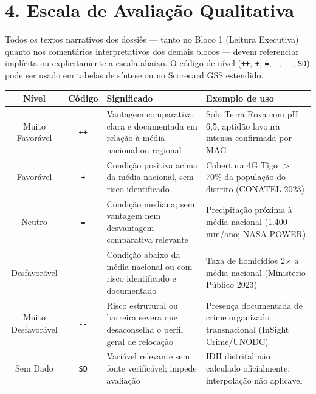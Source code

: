 \section*{4. Escala de Avaliação Qualitativa}

Todos os textos narrativos dos dossiês — tanto no Bloco 1 (Leitura Executiva) quanto nos comentários interpretativos dos demais blocos — devem referenciar implícita ou explicitamente a escala abaixo. O código de nível (\texttt{++}, \texttt{+}, \texttt{=}, \texttt{-}, \texttt{-{}-}, \texttt{SD}) pode ser usado em tabelas de síntese ou no Scorecard GSS estendido.

\bigskip

\renewcommand{\arraystretch}{1.4}
\begin{tabularx}{\linewidth}{|c|c|X|X|}
\hline
\textbf{Nível} & \textbf{Código} & \textbf{Significado} & \textbf{Exemplo de uso} \\
\hline
Muito Favorável   & \texttt{++} & Vantagem comparativa clara e documentada em relação à média nacional ou regional & Solo Terra Roxa com pH 6,5, aptidão lavoura intensa confirmada por MAG \\
\hline
Favorável         & \texttt{+}  & Condição positiva acima da média nacional, sem risco identificado               & Cobertura 4G Tigo $>$70\% da população do distrito (CONATEL 2023) \\
\hline
Neutro            & \texttt{=}  & Condição mediana; sem vantagem nem desvantagem comparativa relevante             & Precipitação próxima à média nacional (1.400 mm/ano; NASA POWER) \\
\hline
Desfavorável      & \texttt{-}  & Condição abaixo da média nacional ou com risco identificado e documentado        & Taxa de homicídios 2$\times$ a média nacional (Ministerio Público 2023) \\
\hline
Muito Desfavorável & \texttt{-{}-} & Risco estrutural ou barreira severa que desaconselha o perfil geral de relocação & Presença documentada de crime organizado transnacional (InSight Crime/UNODC) \\
\hline
Sem Dado          & \texttt{SD} & Variável relevante sem fonte verificável; impede avaliação                        & IDH distrital não calculado oficialmente; interpolação não aplicável \\
\hline
\end{tabularx}
\renewcommand{\arraystretch}{1.0}


